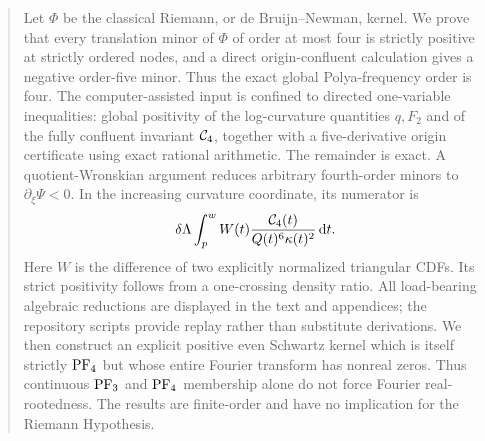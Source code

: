 \begin{abstract}
Let \(\Phi\) be the classical Riemann, or de Bruijn--Newman, kernel. We prove
that every translation minor of \(\Phi\) of order at most four is strictly
positive at strictly ordered nodes, and a direct origin-confluent calculation
gives a negative order-five minor. Thus the exact global Polya-frequency order
is four. The computer-assisted input is confined to directed one-variable
inequalities: global positivity of the log-curvature quantities \(q,F_2\) and
of the fully confluent invariant \(\Cfour\), together with a five-derivative
origin certificate using exact rational arithmetic. The remainder is exact. A
quotient-Wronskian argument reduces arbitrary fourth-order minors to
\(\partial_\xi\Psi<0\). In the increasing curvature coordinate, its numerator
is
\[
 \delta\Lambda\int_p^w
 W(t)\frac{\Cfour(t)}{Q(t)^6\kappa(t)^2}\dd t.
\]
Here \(W\) is the difference of two explicitly normalized triangular CDFs.
Its strict positivity follows from a one-crossing density ratio. All
load-bearing algebraic reductions are displayed in the text and appendices;
the repository scripts provide replay rather than substitute derivations.
We then construct an explicit positive even Schwartz kernel which is itself
strictly \(\PF_4\) but whose entire Fourier transform has nonreal zeros. Thus
continuous \(\PF_3\) and \(\PF_4\) membership alone do not force Fourier
real-rootedness. The results are finite-order and have no implication for the
Riemann Hypothesis.
\end{abstract}
